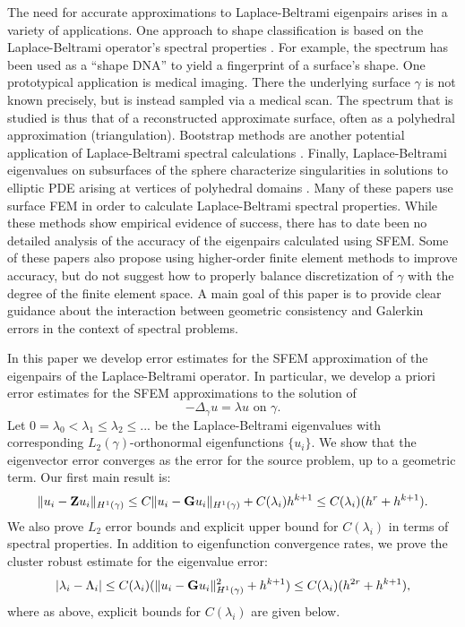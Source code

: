 \documentclass{siamart0516}
\numberwithin{equation}{section}
\numberwithin{theorem}{section}
\numberwithin{figure}{section}
\begin{document}
The need for accurate approximations to Laplace-Beltrami eigenpairs arises in a variety of applications.  One approach to shape classification is based on the Laplace-Beltrami operator's spectral properties \cite{RWP05, RWP06, ReWoShNi09, RBGPS09, R10, KLO16, RSDCT09}.  For example, the spectrum has been used as a ``shape DNA'' to yield a fingerprint of a surface's shape.  One prototypical application is medical imaging.  There the underlying surface $\gamma$ is not known precisely, but is instead sampled via a medical scan.  The spectrum that is studied is thus that of a reconstructed approximate surface, often as a polyhedral approximation (triangulation).  Bootstrap methods are another potential application of Laplace-Beltrami spectral calculations \cite{BC15}.  Finally, Laplace-Beltrami eigenvalues on subsurfaces of the sphere characterize singularities in solutions to elliptic PDE arising at vertices of polyhedral domains \cite{Da88, KMR01, MR10}.    Many of these papers use surface FEM in order to calculate Laplace-Beltrami spectral properties.  While these methods show empirical evidence of success, there has to date been no detailed analysis of the accuracy of the eigenpairs calculated using SFEM.  Some of these papers also propose using higher-order finite element methods to improve accuracy, but do not suggest how to properly balance discretization of $\gamma$ with the degree of the finite element space.  A main goal of this paper is to provide clear guidance about the interaction between geometric consistency and Galerkin errors in the context of spectral problems.  

In this paper we develop error estimates for the SFEM approximation of the eigenpairs of the Laplace-Beltrami operator.  In particular, we develop a priori error estimates for the SFEM approximations to the solution of
$$
-\Delta_\gamma u = \lambda u \text{ on } \gamma.
$$
Let $0=\lambda_0 < \lambda_1 \le \lambda_2 \le ...$ be the Laplace-Beltrami eigenvalues with corresponding $L_2(\gamma)$-orthonormal eigenfunctions $\{ u_i\}$.   We show that the eigenvector error converges as the error for the source problem, up to a geometric term.   Our first main result is:
\begin{equation}
\label{surf_est}
\|u_i-{\bf Z} u_i\|_{H^1(\gamma)} \le C \|u_i-{\bf G} u_i\|_{H^1(\gamma)} +C(\lambda_i) h^{k+1} \le C(\lambda_i)( h^r + h^{k+1}).
\end{equation}
We also prove $L_2$ error bounds and explicit upper bound for $C(\lambda_i)$ in terms of spectral properties.  In addition to eigenfunction convergence rates, we prove the cluster robust estimate for the eigenvalue error:
\begin{equation}
|\lambda_i-\Lambda_i|  \le C(\lambda_i) (\|u_i-{\bf G} u_i\|_{H^1(\gamma)}^2 +h^{k+1}) \le C(\lambda_i)( h^{2r}+h^{k+1}),
\label{ClusterEigBound}
\end{equation}
where as above, explicit bounds for $C(\lambda_i)$ are given below.
\end{document}
